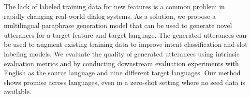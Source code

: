 The lack of labeled training data for new features is a common problem in rapidly changing real-world dialog systems. As a solution, we propose a multilingual paraphrase generation model that can be used to generate novel utterances for a target feature and target language. The generated utterances can be used to augment existing training data to improve intent classification and slot labeling models. We evaluate the quality of generated utterances using intrinsic evaluation metrics and by conducting downstream evaluation experiments with English as the source language and nine different target languages. Our method shows promise across languages, even in a zero-shot setting where no seed data is available.
